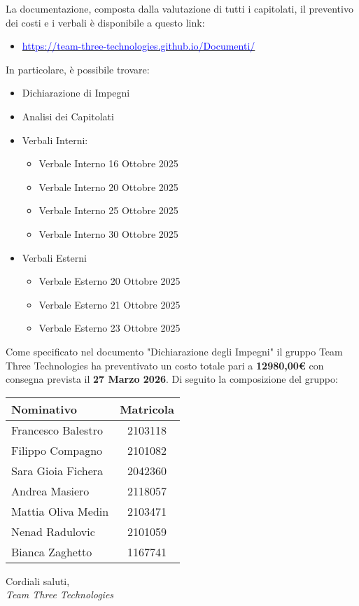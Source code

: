 \documentclass[a4paper,12pt]{article}
\begin{document}
La documentazione, composta dalla valutazione di tutti i capitolati, il preventivo dei costi e i verbali è disponibile a questo link: 

\begin{itemize}
    \item \href{https://team-three-technologies.github.io/Documenti/}{\textcolor{blue} {https://team-three-technologies.github.io/Documenti/}}
\end{itemize}

In particolare, è possibile trovare: 
\begin{itemize}
    \item Dichiarazione di Impegni
    \item Analisi dei Capitolati
    \item Verbali Interni: 
    \begin{itemize}
        \item Verbale Interno 16 Ottobre 2025
        \item Verbale Interno 20 Ottobre 2025
        \item Verbale Interno 25 Ottobre 2025
        \item Verbale Interno 30 Ottobre 2025
    \end{itemize}
    \item Verbali Esterni
    \begin{itemize}
        \item Verbale Esterno 20 Ottobre 2025
        \item Verbale Esterno 21 Ottobre 2025
        \item Verbale Esterno 23 Ottobre 2025
    \end{itemize}
\end{itemize}

Come specificato nel documento "Dichiarazione degli Impegni" il gruppo Team Three \mbox{Technologies} ha preventivato un costo totale pari a \textbf{12980,00\euro} con consegna prevista il \textbf{27 Marzo 2026}. \newpage
Di seguito la composizione del gruppo: 
\begin{center}
\begin{tabular}{|l|c|}
\hline
\rowcolor{lightgray}
\textbf{Nominativo} & \textbf{Matricola} \\ 
\hline
Francesco Balestro & 2103118 \\ 
Filippo Compagno & 2101082 \\ 
Sara Gioia Fichera & 2042360 \\ 
Andrea Masiero & 2118057\\
Mattia Oliva Medin & 2103471\\
Nenad Radulovic & 2101059\\
Bianca Zaghetto & 1167741\\
\hline

\end{tabular}
\end{center}

\vspace{1cm}
Cordiali saluti,\\[0.3cm]
\textit{Team Three Technologies}
\end{document}
